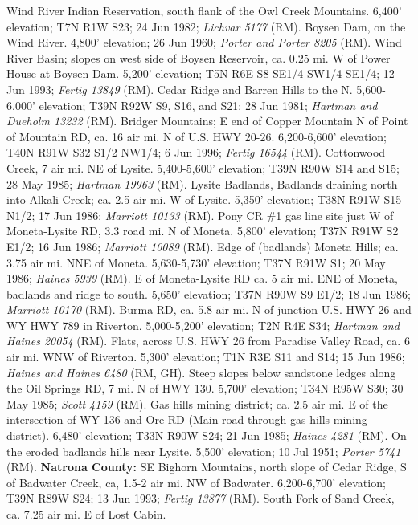 Wind River Indian Reservation, south flank of the Owl Creek Mountains.
6,400' elevation; T7N R1W S23; 24 Jun 1982; \textit{Lichvar 5177} (RM).
Boysen Dam, on the Wind River. 4,800' elevation; 26 Jun 1960;
\textit{Porter and Porter 8205} (RM).
Wind River Basin; slopes on west side of Boysen Reservoir, ca. 0.25 mi. W of
Power House at Boysen Dam. 5,200' elevation; T5N R6E S8	SE1/4 SW1/4 SE1/4;
12 Jun 1993; \textit{Fertig 13849} (RM).
Cedar Ridge and Barren Hills to the N. 5,600-6,000' elevation; T39N R92W S9,
S16, and S21; 28 Jun 1981; \textit{Hartman and Dueholm 13232} (RM).
Bridger Mountains; E end of Copper Mountain N of Point of Mountain RD, ca. 16
air mi. N of U.S. HWY 20-26. 6,200-6,600' elevation; T40N R91W S32 S1/2 NW1/4;
6 Jun 1996; \textit{Fertig 16544} (RM).
Cottonwood Creek, 7 air mi. NE of Lysite. 5,400-5,600' elevation; T39N R90W S14
and S15; 28 May 1985; \textit{Hartman 19963} (RM).
Lysite Badlands, Badlands draining north into Alkali Creek; ca. 2.5 air mi. W of
Lysite. 5,350' elevation; T38N R91W S15	N1/2; 17 Jun 1986;
\textit{Marriott 10133} (RM).
Pony CR \#1 gas line site just W of Moneta-Lysite RD, 3.3 road mi. N of Moneta.
5,800' elevation; T37N R91W S2	E1/2; 16 Jun 1986; \textit{Marriott 10089} (RM).
Edge of (badlands) Moneta Hills; ca. 3.75 air mi. NNE of Moneta.
5,630-5,730' elevation; T37N R91W S1; 20 May 1986; \textit{Haines 5939} (RM).
E of Moneta-Lysite RD ca. 5 air mi. ENE of Moneta, badlands and ridge to south.
5,650' elevation; T37N R90W S9	E1/2; 18 Jun 1986; \textit{Marriott 10170} (RM).
Burma RD, ca. 5.8 air mi. N of junction U.S. HWY 26 and WY HWY 789 in Riverton.
5,000-5,200' elevation; T2N R4E S34; \textit{Hartman and Haines 20054} (RM).
Flats, across U.S. HWY 26 from Paradise Valley Road, ca. 6 air mi. WNW of
Riverton. 5,300' elevation; T1N R3E S11 and S14; 15 Jun 1986;
\textit{Haines and Haines 6480} (RM, GH).
Steep slopes below sandstone ledges along the Oil Springs RD, 7 mi. N of HWY 130.
5,700' elevation; T34N R95W S30; 30 May 1985; \textit{Scott 4159} (RM).
Gas hills mining district; ca. 2.5 air mi. E of the intersection of WY 136 and
Ore RD (Main road through gas hills mining district). 6,480' elevation;
T33N R90W S24; 21 Jun 1985; \textit{Haines 4281} (RM).
On the eroded badlands hills near Lysite. 5,500' elevation; 10 Jul 1951;
\textit{Porter 5741} (RM).
  \textbf{Natrona County:}
SE Bighorn Mountains, north slope of Cedar Ridge, S of Badwater Creek, ca, 1.5-2
air mi. NW of Badwater. 6,200-6,700’ elevation; T39N R89W S24; 13 Jun 1993;
\textit{Fertig 13877} (RM).
South Fork of Sand Creek, ca. 7.25 air mi. E of Lost Cabin.
